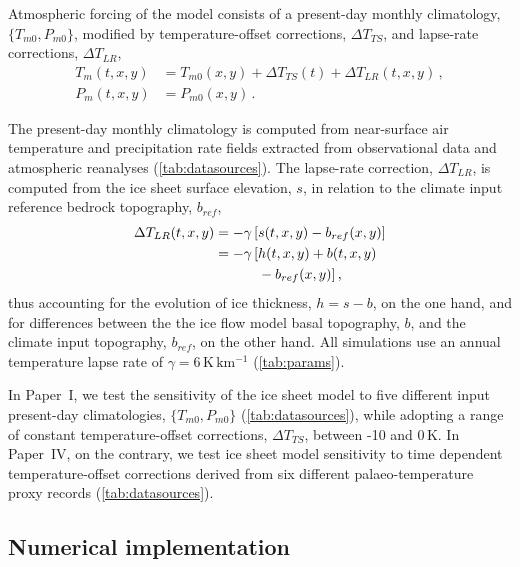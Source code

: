 \documentclass[a4paper]{kappa}
\newcommand{\unit}[1]{\ensuremath{\mathrm{#1}}}
\newcommand{\CCLI}[0]{Paper~I}      %
\newcommand{\CCYC}[0]{Paper~IV}     %
\begin{document}
Atmospheric forcing of the model consists of a present-day monthly climatology,
$\{T_{m0}, P_{m0}\}$, modified by temperature-offset corrections,
${\Delta}T_{TS}$, and lapse-rate corrections, ${\Delta}T_{LR}$,
\begin{subequations}
\begin{align}
    T_m(t, x, y) &= T_{m0}(x, y) + {\Delta}T_{TS}(t)
                                 + {\Delta}T_{LR}(t, x, y) \,, \\
    P_m(t, x, y) &= P_{m0}(x, y) \,.
\end{align}
\end{subequations}

The present-day monthly climatology is computed from
near-surface air temperature and precipitation rate fields extracted from
observational data and atmospheric reanalyses (\cref{tab:datasources}).
The lapse-rate correction, ${\Delta}T_{LR}$, is computed from the ice sheet
surface elevation, $s$, in relation to the
climate input reference bedrock topography, $b_{ref}$,
\begin{align}
    {\Delta}T_{LR}(t, x, y) = -\gamma\,[&s(t, x, y) - b_{ref}(x, y)] \\
                            = -\gamma\,[&h(t, x, y) + b(t, x, y) \notag \\
                                        &- b_{ref}(x, y)] \,,
\end{align}
thus accounting for the evolution of ice thickness, ${h=s-b}$, on the one hand,
and
for differences between the the ice flow model basal topography, $b$, and the
climate input topography, $b_{ref}$, on the other hand. All simulations use an
annual temperature lapse rate of $\gamma = 6\,\unit{K\,km^{-1}}$
(\cref{tab:params}).

In \CCLI, we test the sensitivity of the ice sheet model to five different
input present-day climatologies, $\{T_{m0}, P_{m0}\}$ (\cref{tab:datasources}),
while adopting a range of constant temperature-offset corrections,
${\Delta}T_{TS}$, between -10 and 0\,K. In \CCYC, on the contrary, we test ice
sheet model sensitivity to time dependent temperature-offset corrections
derived from six different palaeo-temperature proxy records
(\cref{tab:datasources}).


\subsection{Numerical implementation}
\end{document}
